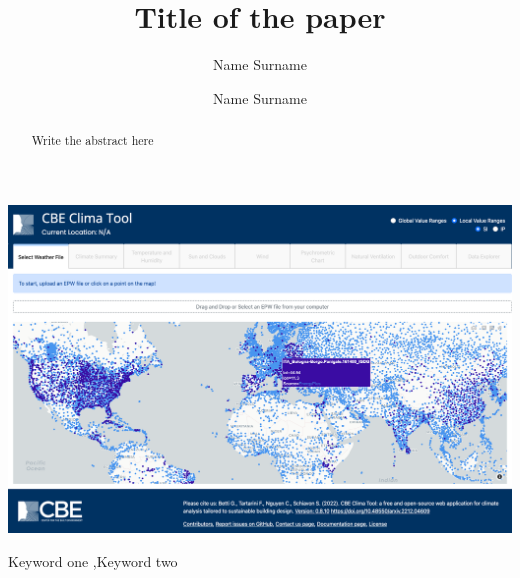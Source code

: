 \begin{frontmatter}

    \title{Title of the paper}

    \author[label1]{Name Surname}
    \author[label2]{Name Surname}

    \address[label2]{Center for the Built Environment, University of California, Berkeley, CA, USA}


    \begin{abstract}
        Write the abstract here
    \end{abstract}

    \begin{graphicalabstract}
        \includegraphics[width=\linewidth]{figures/example_clima}
    \end{graphicalabstract}

    \begin{highlights}
        \item 
        \item 
        \item
    \end{highlights}

    \begin{keyword}
        Keyword one \sep Keyword two
    \end{keyword}

\end{frontmatter}

